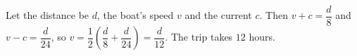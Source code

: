 Let the distance be $d$, the boat's speed $v$ and the current $c$. Then $v+c=\dfrac d8$ and $v-c=\dfrac d{24}$, so $v=\dfrac12\left(\dfrac d8+\dfrac d{24}\right)=\dfrac d{12}$. The trip takes $\boxed{12}$ hours.
